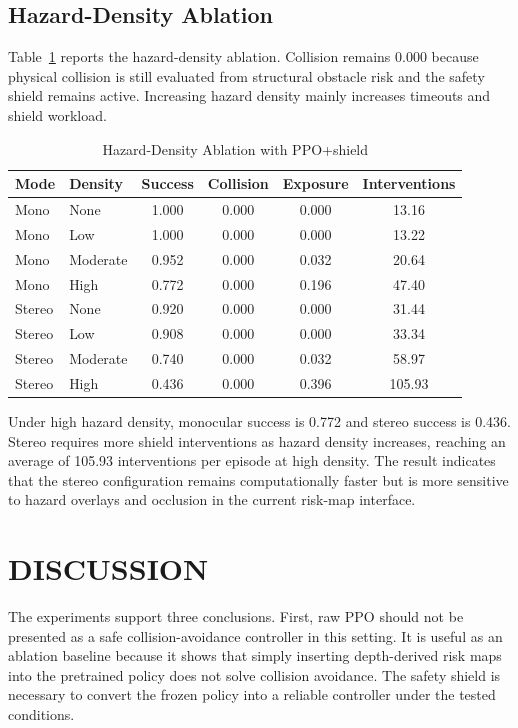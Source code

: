 \documentclass[12pt]{article}
\begin{document}
\subsection{Hazard-Density Ablation}

\noindent
Table~\ref{tab:hazard_density} reports the hazard-density ablation. Collision remains 0.000 because physical collision is still evaluated from structural obstacle risk and the safety shield remains active. Increasing hazard density mainly increases timeouts and shield workload.

\begin{table}[htbp]
\centering
\caption{Hazard-Density Ablation with PPO+shield}
\label{tab:hazard_density}
\begin{tabular}{llcccc}
\toprule
Mode & Density & Success & Collision & Exposure & Interventions \\
\midrule
Mono & None & 1.000 & 0.000 & 0.000 & 13.16 \\
Mono & Low & 1.000 & 0.000 & 0.000 & 13.22 \\
Mono & Moderate & 0.952 & 0.000 & 0.032 & 20.64 \\
Mono & High & 0.772 & 0.000 & 0.196 & 47.40 \\
Stereo & None & 0.920 & 0.000 & 0.000 & 31.44 \\
Stereo & Low & 0.908 & 0.000 & 0.000 & 33.34 \\
Stereo & Moderate & 0.740 & 0.000 & 0.032 & 58.97 \\
Stereo & High & 0.436 & 0.000 & 0.396 & 105.93 \\
\bottomrule
\end{tabular}
\end{table}

Under high hazard density, monocular success is 0.772 and stereo success is 0.436. Stereo requires more shield interventions as hazard density increases, reaching an average of 105.93 interventions per episode at high density. The result indicates that the stereo configuration remains computationally faster but is more sensitive to hazard overlays and occlusion in the current risk-map interface.

\section{\MakeUppercase{Discussion}}

\noindent
The experiments support three conclusions. First, raw PPO should not be presented as a safe collision-avoidance controller in this setting. It is useful as an ablation baseline because it shows that simply inserting depth-derived risk maps into the pretrained policy does not solve collision avoidance. The safety shield is necessary to convert the frozen policy into a reliable controller under the tested conditions.
\end{document}
